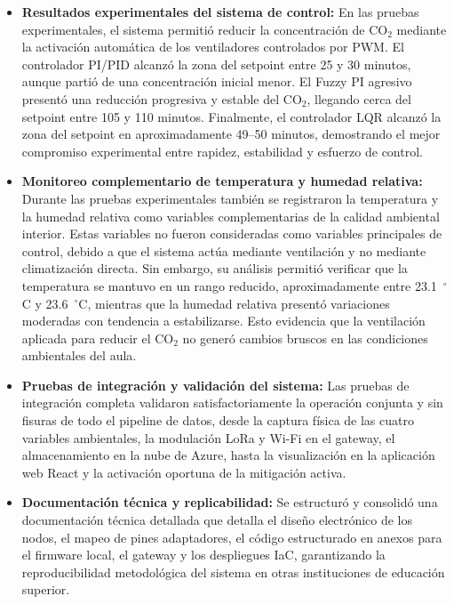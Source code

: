 \begin{itemize}
    \item \textbf{Resultados experimentales del sistema de control:} En las pruebas experimentales, el sistema permitió reducir la concentración de CO\(_2\) mediante la activación automática de los ventiladores controlados por PWM. El controlador PI/PID alcanzó la zona del setpoint entre 25 y 30 minutos, aunque partió de una concentración inicial menor. El Fuzzy PI agresivo presentó una reducción progresiva y estable del CO\(_2\), llegando cerca del setpoint entre 105 y 110 minutos. Finalmente, el controlador LQR alcanzó la zona del setpoint en aproximadamente 49--50 minutos, demostrando el mejor compromiso experimental entre rapidez, estabilidad y esfuerzo de control.

    \item \textbf{Monitoreo complementario de temperatura y humedad relativa:} Durante las pruebas experimentales también se registraron la temperatura y la humedad relativa como variables complementarias de la calidad ambiental interior. Estas variables no fueron consideradas como variables principales de control, debido a que el sistema actúa mediante ventilación y no mediante climatización directa. Sin embargo, su análisis permitió verificar que la temperatura se mantuvo en un rango reducido, aproximadamente entre 23.1~\(^\circ\)C y 23.6~\(^\circ\)C, mientras que la humedad relativa presentó variaciones moderadas con tendencia a estabilizarse. Esto evidencia que la ventilación aplicada para reducir el CO\(_2\) no generó cambios bruscos en las condiciones ambientales del aula.
    \item \textbf{Pruebas de integración y validación del sistema:} Las pruebas de integración completa validaron satisfactoriamente la operación conjunta y sin fisuras de todo el pipeline de datos, desde la captura física de las cuatro variables ambientales, la modulación LoRa y Wi-Fi en el gateway, el almacenamiento en la nube de Azure, hasta la visualización en la aplicación web React y la activación oportuna de la mitigación activa.

    \item \textbf{Documentación técnica y replicabilidad:} Se estructuró y consolidó una documentación técnica detallada que detalla el diseño electrónico de los nodos, el mapeo de pines adaptadores, el código estructurado en anexos para el firmware local, el gateway y los despliegues IaC, garantizando la reproducibilidad metodológica del sistema en otras instituciones de educación superior.
\end{itemize}

